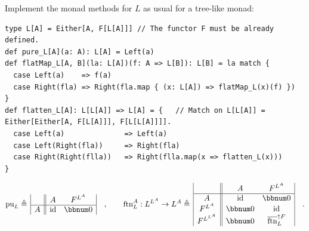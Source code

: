 Implement the monad methods for $L$ as usual for a tree-like monad:
\begin{lstlisting}
type L[A] = Either[A, F[L[A]]] // The functor F must be already defined.
def pure_L[A](a: A): L[A] = Left(a)
def flatMap_L[A, B](la: L[A])(f: A => L[B]): L[B] = la match {
  case Left(a)    => f(a)
  case Right(fla) => Right(fla.map { (x: L[A]) => flatMap_L(x)(f) })
}
def flatten_L[A]: L[L[A]] => L[A] = {   // Match on L[L[A]] = Either[Either[A, F[L[A]]], F[L[L[A]]]].
  case Left(a)              => Left(a)
  case Left(Right(fla))     => Right(fla)
  case Right(Right(flla))   => Right(flla.map(x => flatten_L(x)))
}
\end{lstlisting}
\[
\text{pu}_{L}\triangleq\,\begin{array}{|c||cc|}
 & A & F^{L^{A}}\\
\hline A & \text{id} & \bbnum 0
\end{array}\quad,\quad\quad\text{ftn}_{L}^{A}:L^{L^{A}}\rightarrow L^{A}\triangleq\,\begin{array}{|c||cc|}
 & A & F^{L^{A}}\\
\hline A & \text{id} & \bbnum 0\\
F^{L^{A}} & \bbnum 0 & \text{id}\\
F^{L^{L^{A}}} & \bbnum 0 & \overline{\text{ftn}}_{L}^{\uparrow F}
\end{array}\quad.
\]

